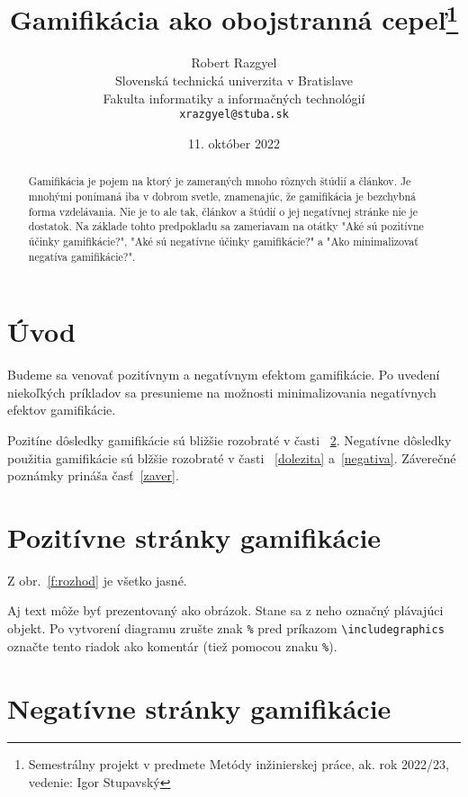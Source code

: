 \documentclass[10pt,twoside,slovak,a4paper]{article}
\title{Gamifikácia ako obojstranná cepeľ\thanks{Semestrálny projekt v predmete Metódy inžinierskej práce, ak. rok 2022/23, vedenie: Igor Stupavský}} %
\author{Robert Razgyel\\[2pt]
	{\small Slovenská technická univerzita v Bratislave}\\
	{\small Fakulta informatiky a informačných technológií}\\
	{\small \texttt{xrazgyel@stuba.sk}}
	}
\date{\small 11. október 2022} %
\begin{document}
\maketitle

\begin{abstract}
Gamifikácia je pojem na ktorý je zameraných mnoho rôznych štúdií a článkov. Je mnohými ponímaná iba v dobrom svetle, znamenajúc, že gamifikácia je bezchybná forma vzdelávania. Nie je to ale tak, článkov a štúdií o jej negatívnej stránke nie je dostatok. Na základe tohto predpokladu sa zameriavam na otátky "Aké sú pozitívne účinky gamifikácie?", "Aké sú negatívne účinky gamifikácie?" a "Ako minimalizovať negatíva gamifikácie?". 
\end{abstract}



\section{Úvod}

Budeme sa venovať pozitívnym a negatívnym efektom gamifikácie. Po uvedení niekoľkých príkladov sa presunieme na možnosti minimalizovania negatívnych efektov gamifikácie.

Pozitíne dôsledky gamifikácie sú bližšie rozobraté v časti ~\ref{pozitiva}.
Negatívne dôsledky použitia gamifikácie sú blžšie rozobraté v časti ~\ref{dolezita} a~\ref{negativa}.
Záverečné poznámky prináša časť~\ref{zaver}.



\section{Pozitívne stránky gamifikácie} \label{pozitiva}

Z obr.~\ref{f:rozhod} je všetko jasné. 

\begin{figure*}[tbh]
\centering
Aj text môže byť prezentovaný ako obrázok. Stane sa z neho označný plávajúci objekt. Po vytvorení diagramu zrušte znak \texttt{\%} pred príkazom \verb|\includegraphics| označte tento riadok ako komentár (tiež pomocou znaku \texttt{\%}).
\caption{Rozhodujúci argument.}
\label{f:rozhod}
\end{figure*}


\section{Negatívne stránky gamifikácie} \label{ina}
\end{document}
